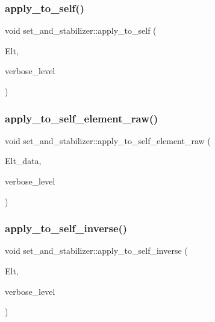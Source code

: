 \subsubsection{\texorpdfstring{apply\+\_\+to\+\_\+self()}{apply\_to\_self()}}
{\footnotesize\ttfamily void set\+\_\+and\+\_\+stabilizer\+::apply\+\_\+to\+\_\+self (\begin{DoxyParamCaption}\item[{\mbox{\hyperlink{galois_8h_a09fddde158a3a20bd2dcadb609de11dc}{I\+NT}} $\ast$}]{Elt,  }\item[{\mbox{\hyperlink{galois_8h_a09fddde158a3a20bd2dcadb609de11dc}{I\+NT}}}]{verbose\+\_\+level }\end{DoxyParamCaption})}

\mbox{\label{classset__and__stabilizer_aa7730cf2de0ea01c59c1fe9e3beeb550}} 
\subsubsection{\texorpdfstring{apply\+\_\+to\+\_\+self\+\_\+element\+\_\+raw()}{apply\_to\_self\_element\_raw()}}
{\footnotesize\ttfamily void set\+\_\+and\+\_\+stabilizer\+::apply\+\_\+to\+\_\+self\+\_\+element\+\_\+raw (\begin{DoxyParamCaption}\item[{\mbox{\hyperlink{galois_8h_a09fddde158a3a20bd2dcadb609de11dc}{I\+NT}} $\ast$}]{Elt\+\_\+data,  }\item[{\mbox{\hyperlink{galois_8h_a09fddde158a3a20bd2dcadb609de11dc}{I\+NT}}}]{verbose\+\_\+level }\end{DoxyParamCaption})}

\mbox{\label{classset__and__stabilizer_a6e18b805c0f6dfe0c8dd9762411d9e41}} 
\subsubsection{\texorpdfstring{apply\+\_\+to\+\_\+self\+\_\+inverse()}{apply\_to\_self\_inverse()}}
{\footnotesize\ttfamily void set\+\_\+and\+\_\+stabilizer\+::apply\+\_\+to\+\_\+self\+\_\+inverse (\begin{DoxyParamCaption}\item[{\mbox{\hyperlink{galois_8h_a09fddde158a3a20bd2dcadb609de11dc}{I\+NT}} $\ast$}]{Elt,  }\item[{\mbox{\hyperlink{galois_8h_a09fddde158a3a20bd2dcadb609de11dc}{I\+NT}}}]{verbose\+\_\+level }\end{DoxyParamCaption})}

